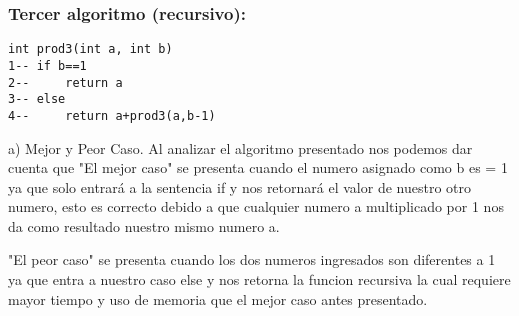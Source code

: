 \documentclass[12pt,twoside]{article}
\begin{document}
\subsubsection{Tercer algoritmo (recursivo):}
\begin{lstlisting}
int prod3(int a, int b)
1--	if b==1
2--		return a
3--	else
4--		return a+prod3(a,b-1)
\end{lstlisting}
\begin{enumerate} a) Mejor y Peor Caso. \newline\newline
Al analizar el algoritmo presentado nos podemos dar cuenta que "El mejor caso" se presenta cuando el numero asignado como b es = 1 ya que solo entrará a la sentencia if y nos retornará el valor de nuestro otro n\´umero, esto es correcto debido a que cualquier n\´umero a multiplicado por 1 nos da como resultado nuestro mismo n\´umero a.

"El peor caso" se presenta cuando los dos numeros ingresados son diferentes a 1 ya que entra a nuestro caso else y nos retorna la funci\´on recursiva la cual requiere mayor tiempo y uso de memoria que el mejor caso antes presentado.
\end{enumerate}
\end{document}
